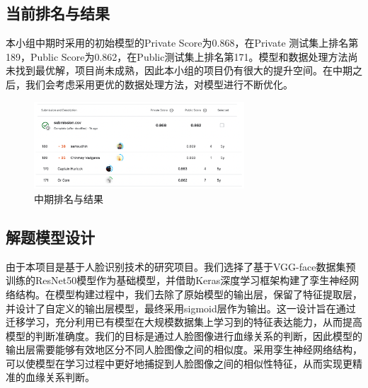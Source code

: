 \documentclass[UTF8]{ctexart}
\begin{document}
\subsection{当前排名与结果}
本小组中期时采用的初始模型的Private Score为0.868，在Private 测试集上排名第189，Public Score为0.862，在Public测试集上排名第171。模型和数据处理方法尚未找到最优解，项目尚未成熟，因此本小组的项目仍有很大的提升空间。在中期之后，我们会考虑采用更优的数据处理方法，对模型进行不断优化。
\begin{figure}[!ht]
  \centering
  \includegraphics[width=0.7\textwidth]{score.png}
  \caption{中期排名与结果}
  \label{fig:score}
\end{figure}

\subsection{解题模型设计}
由于本项目是基于人脸识别技术的研究项目。我们选择了基于VGG-face数据集预训练的ResNet50模型作为基础模型，并借助Keras深度学习框架构建了孪生神经网络结构。在模型构建过程中，我们去除了原始模型的输出层，保留了特征提取层，并设计了自定义的输出层模型，最终采用sigmoid层作为输出。这一设计旨在通过迁移学习，充分利用已有模型在大规模数据集上学习到的特征表达能力，从而提高模型的判断准确度。我们的目标是通过人脸图像进行血缘关系的判断，因此模型的输出层需要能够有效地区分不同人脸图像之间的相似度。采用孪生神经网络结构，可以使模型在学习过程中更好地捕捉到人脸图像之间的相似性特征，从而实现更精准的血缘关系判断。
\end{document}
